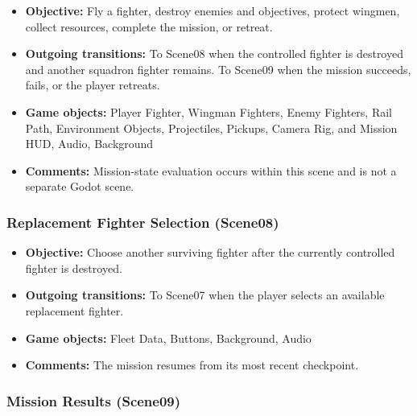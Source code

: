 \documentclass[journal]{IEEEtran}
\begin{document}
\begin{itemize}
    \item \textbf{Objective:}
    Fly a fighter, destroy enemies and objectives,
    protect wingmen, collect resources, complete the mission, or retreat.

    \item \textbf{Outgoing transitions:}
    To Scene08 when the controlled fighter is destroyed and another
    squadron fighter remains.
    To Scene09 when the mission succeeds, fails, or the player retreats.

    \item \textbf{Game objects:}
    Player Fighter, Wingman Fighters, Enemy Fighters,
    Rail Path, Environment Objects, Projectiles,
    Pickups, Camera Rig, and Mission HUD, Audio, Background

    \item \textbf{Comments:}
    Mission-state evaluation occurs within this scene and is not a
    separate Godot scene.
\end{itemize}


\subsubsection{Replacement Fighter Selection (Scene08)}

\begin{itemize}
    \item \textbf{Objective:}
    Choose another surviving fighter after the
    currently controlled fighter is destroyed.

    \item \textbf{Outgoing transitions:}
    To Scene07 when the player selects an available replacement fighter.

    \item \textbf{Game objects:}
    Fleet Data, Buttons, Background, Audio

    \item \textbf{Comments:}
    The mission resumes from its most recent checkpoint.
\end{itemize}


\subsubsection{Mission Results (Scene09)}
\end{document}
